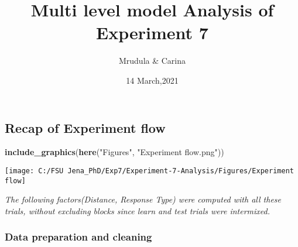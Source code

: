 \documentclass[
]{article}
\title{Multi level model Analysis of Experiment 7}
\author{Mrudula \& Carina}
\date{14 March,2021}
\newenvironment{Shaded}{\begin{snugshade}}{\end{snugshade}}
\newcommand{\KeywordTok}[1]{\textcolor[rgb]{0.13,0.29,0.53}{\textbf{#1}}}
\newcommand{\NormalTok}[1]{#1}
\newcommand{\OperatorTok}[1]{\textcolor[rgb]{0.81,0.36,0.00}{\textbf{#1}}}
\newcommand{\StringTok}[1]{\textcolor[rgb]{0.31,0.60,0.02}{#1}}
\begin{document}
\maketitle

{
\setcounter{tocdepth}{2}
\tableofcontents
}
\begin{Shaded}
\end{Shaded}

\hypertarget{recap-of-experiment-flow}{%
\subsection{Recap of Experiment flow}\label{recap-of-experiment-flow}}

\begin{Shaded}
\begin{Highlighting}[]
\KeywordTok{include_graphics}\NormalTok{(}\KeywordTok{here}\NormalTok{(}\StringTok{"Figures"}\NormalTok{, }\StringTok{"Experiment flow.png"}\NormalTok{))}
\end{Highlighting}
\end{Shaded}

\texttt{[image: C:/FSU Jena\_PhD/Exp7/Experiment-7-Analysis/Figures/Experiment flow]}

\emph{The following factors(Distance, Response Type) were computed with
all these trials, without excluding blocks since learn and test trials
were intermixed.}

\hypertarget{data-preparation-and-cleaning}{%
\subsubsection{Data preparation and
cleaning}\label{data-preparation-and-cleaning}}
\end{document}
